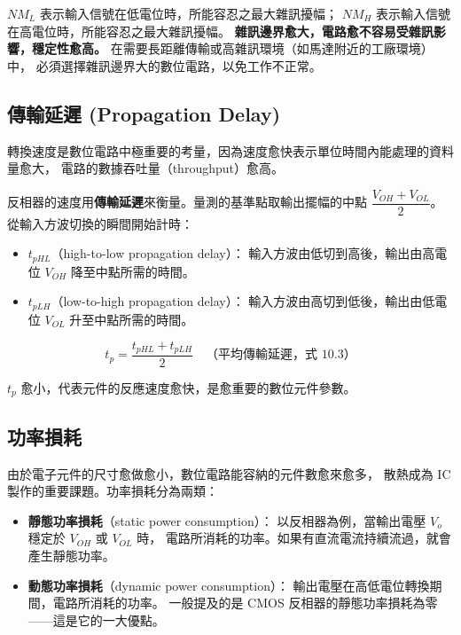\documentclass[12pt]{article}
\begin{document}
$NM_L$ 表示輸入信號在低電位時，所能容忍之最大雜訊擾幅；
$NM_H$ 表示輸入信號在高電位時，所能容忍之最大雜訊擾幅。
\textbf{雜訊邊界愈大，電路愈不容易受雜訊影響，穩定性愈高。}
在需要長距離傳輸或高雜訊環境（如馬達附近的工廠環境）中，
必須選擇雜訊邊界大的數位電路，以免工作不正常。

\subsection*{傳輸延遲 (Propagation Delay)}

轉換速度是數位電路中極重要的考量，因為速度愈快表示單位時間內能處理的資料量愈大，
電路的數據吞吐量（throughput）愈高。

反相器的速度用\textbf{傳輸延遲}來衡量。量測的基準點取輸出擺幅的中點
$\dfrac{V_{OH}+V_{OL}}{2}$。從輸入方波切換的瞬間開始計時：

\begin{itemize}[leftmargin=2.2em,itemsep=2pt]
  \item $t_{pHL}$（high-to-low propagation delay）：
    輸入方波由低切到高後，輸出由高電位 $V_{OH}$ 降至中點所需的時間。
  \item $t_{pLH}$（low-to-high propagation delay）：
    輸入方波由高切到低後，輸出由低電位 $V_{OL}$ 升至中點所需的時間。
\end{itemize}

\begin{formulabox}
\[
  t_p = \frac{t_{pHL} + t_{pLH}}{2} \quad\text{（平均傳輸延遲，式 10.3）}
\]
\end{formulabox}

$t_p$ 愈小，代表元件的反應速度愈快，是愈重要的數位元件參數。

\subsection*{功率損耗}

由於電子元件的尺寸愈做愈小，數位電路能容納的元件數愈來愈多，
散熱成為 IC 製作的重要課題。功率損耗分為兩類：

\begin{itemize}[leftmargin=2.2em,itemsep=2pt]
  \item \textbf{靜態功率損耗}（static power consumption）：
    以反相器為例，當輸出電壓 $V_o$ 穩定於 $V_{OH}$ 或 $V_{OL}$ 時，
    電路所消耗的功率。如果有直流電流持續流過，就會產生靜態功率。
  \item \textbf{動態功率損耗}（dynamic power consumption）：
    輸出電壓在高低電位轉換期間，電路所消耗的功率。
    一般提及的是 CMOS 反相器的靜態功率損耗為零——這是它的一大優點。
\end{itemize}
\end{document}
